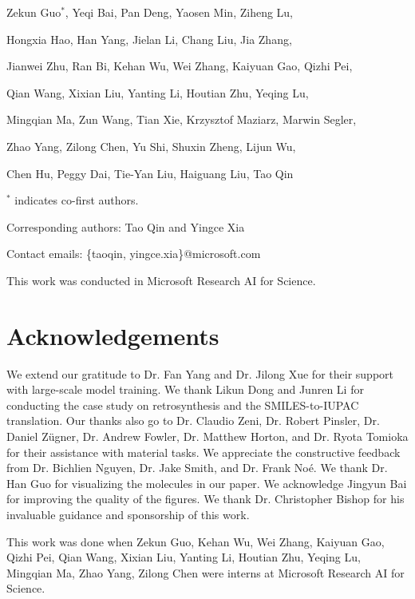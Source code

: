 Zekun Guo$^{*}$, Yeqi Bai, Pan Deng, Yaosen Min, Ziheng Lu, 

Hongxia Hao, Han Yang, Jielan Li, Chang Liu, Jia Zhang, 

Jianwei Zhu, Ran Bi, Kehan Wu, Wei Zhang, Kaiyuan Gao, Qizhi Pei, 

Qian Wang, Xixian Liu, Yanting Li, Houtian Zhu, Yeqing Lu, 

Mingqian Ma, Zun Wang, Tian Xie, Krzysztof Maziarz, Marwin Segler, 

Zhao Yang, Zilong Chen, Yu Shi, Shuxin Zheng, Lijun Wu, 

Chen Hu, Peggy Dai, Tie-Yan Liu, Haiguang Liu, Tao Qin

\vspace{0.5cm}


\noindent$^*$ indicates co-first authors. 
 
\noindent Corresponding authors: Tao Qin and Yingce Xia 

\noindent Contact emails: \{taoqin, yingce.xia\}@microsoft.com

\noindent This work was conducted in Microsoft Research AI for Science.

\section*{Acknowledgements}
We extend our gratitude to Dr. Fan Yang and Dr. Jilong Xue for their support with large-scale model training. We thank Likun Dong and Junren Li for conducting the case study on retrosynthesis and the SMILES-to-IUPAC translation. Our thanks also go to Dr. Claudio Zeni, Dr. Robert Pinsler, Dr. Daniel Z\"{u}gner, Dr. Andrew Fowler, Dr. Matthew Horton, and Dr. Ryota Tomioka for their assistance with material tasks. We appreciate the constructive feedback from Dr. Bichlien Nguyen, Dr. Jake Smith, and Dr. Frank No\'{e}. We thank Dr. Han Guo for visualizing the molecules in our paper. We acknowledge Jingyun Bai for  improving the quality of the figures. We thank Dr. Christopher Bishop for his invaluable guidance and sponsorship of this work.

This work was done when Zekun Guo, Kehan Wu, Wei Zhang, Kaiyuan Gao, Qizhi Pei, Qian Wang, Xixian Liu, Yanting Li, Houtian Zhu, Yeqing Lu, Mingqian Ma, Zhao Yang, Zilong Chen were interns at Microsoft Research AI for Science. %



